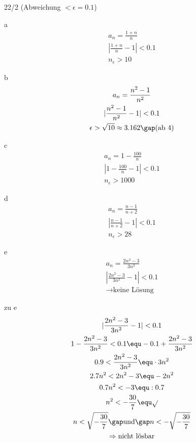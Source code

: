 \begin{exercise}{22/2}
  (Abweichung $< \epsilon = 0.1$)
  \item [a]
  \begin{gather*}
    a_n = \frac{1 + n}{n} \\
    |\frac{1 + n}{n} - 1| < 0.1 \\
    n_\epsilon > 10
  \end{gather*}
  \item [b]
  \begin{gather*}
    a_n = \frac{n^2 - 1}{n^2} \\
    |\frac{n^2 - 1}{n^2} - 1| < 0.1 \\
    \epsilon > \sqrt{10} \approx 3.162\gap \text{(ab 4)}
  \end{gather*}
  \item [c]
  \begin{gather*}
    a_n = 1 - \frac{100}{n} \\
    |1 - \frac{100}{n} - 1| < 0.1 \\
    n_\epsilon > 1000
  \end{gather*}
  \item [d]
  \begin{gather*}
    a_n = \frac{n - 1}{n + 2} \\
    |\frac{n - 1}{n + 2} - 1| < 0.1 \\
    n_\epsilon > 28
  \end{gather*}
  \item [e]
  \begin{gather*}
    a_n = \frac{2n^2 - 3}{3n^2} \\
    |\frac{2n^2 - 3}{3n^2} - 1| < 0.1 \\
    \rightarrow \text{keine Lösung}
  \end{gather*}
  \item [zu e]
  \begin{gather*}
    |\frac{2n^2 - 3}{3n^2} - 1| < 0.1 \\
    1 - \frac{2n^2 - 3}{3n^2} < 0.1 \equ -0.1 + \frac{2n^2 - 3}{3n^2} \\
    0.9 < \frac{2n^2 - 3}{3n^2} \equ \cdot 3n^2 \\
    2.7n^2 < 2n^2 - 3 \equ - 2n^2 \\
    0.7n^2 < -3 \equ : 0.7 \\
    n^2 < -\frac{30}{7} \equ \sqrt{} \\
    n < \sqrt{-\frac{30}{7}} \gap\text{und}\gap n < -\sqrt{-\frac{30}{7}} \\
    \Rightarrow \text{nicht lösbar}
  \end{gather*}
\end{exercise}

